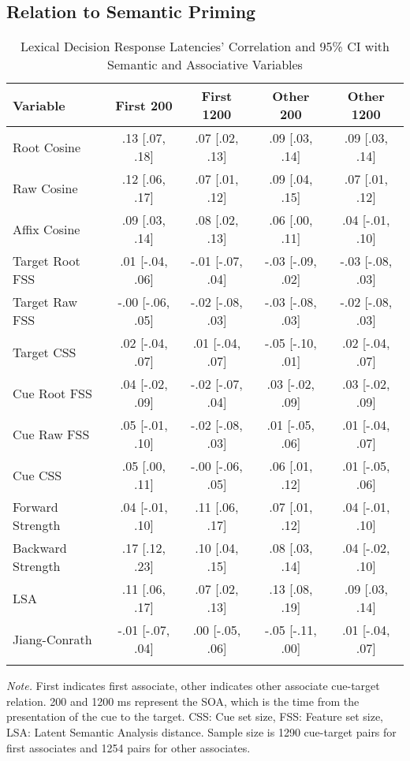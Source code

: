 \documentclass[english,,man]{apa6}
\theoremstyle{definition}
\theoremstyle{definition}
\theoremstyle{definition}
\theoremstyle{remark}
\begin{document}
\subsection{Relation to Semantic
Priming}\label{relation-to-semantic-priming}

\begin{table}[tbp]
\begin{center}
\begin{threeparttable}
\caption{\label{tab:ldt-table}Lexical Decision Response Latencies' Correlation and 95\% CI with Semantic and Associative Variables}
\small{
\begin{tabular}{lcccc}
\toprule
Variable & \multicolumn{1}{c}{First 200} & \multicolumn{1}{c}{First 1200} & \multicolumn{1}{c}{Other 200} & \multicolumn{1}{c}{Other 1200}\\
\midrule
Root Cosine & .13 [.07, .18] & .07 [.02, .13] & .09 [.03, .14] & .09 [.03, .14]\\
Raw Cosine & .12 [.06, .17] & .07 [.01, .12] & .09 [.04, .15] & .07 [.01, .12]\\
Affix Cosine & .09 [.03, .14] & .08 [.02, .13] & .06 [.00, .11] & .04 [-.01, .10]\\
Target Root FSS & .01 [-.04, .06] & -.01 [-.07, .04] & -.03 [-.09, .02] & -.03 [-.08, .03]\\
Target Raw FSS & -.00 [-.06, .05] & -.02 [-.08, .03] & -.03 [-.08, .03] & -.02 [-.08, .03]\\
Target CSS & .02 [-.04, .07] & .01 [-.04, .07] & -.05 [-.10, .01] & .02 [-.04, .07]\\
Cue Root FSS & .04 [-.02, .09] & -.02 [-.07, .04] & .03 [-.02, .09] & .03 [-.02, .09]\\
Cue Raw FSS & .05 [-.01, .10] & -.02 [-.08, .03] & .01 [-.05, .06] & .01 [-.04, .07]\\
Cue CSS & .05 [.00, .11] & -.00 [-.06, .05] & .06 [.01, .12] & .01 [-.05, .06]\\
Forward Strength & .04 [-.01, .10] & .11 [.06, .17] & .07 [.01, .12] & .04 [-.01, .10]\\
Backward Strength & .17 [.12, .23] & .10 [.04, .15] & .08 [.03, .14] & .04 [-.02, .10]\\
LSA & .11 [.06, .17] & .07 [.02, .13] & .13 [.08, .19] & .09 [.03, .14]\\
Jiang-Conrath & -.01 [-.07, .04] & .00 [-.05, .06] & -.05 [-.11, .00] & .01 [-.04, .07]\\
\bottomrule
\addlinespace
\end{tabular}
}
\begin{tablenotes}[para]
\normalsize{\textit{Note.} First indicates first associate, other indicates other associate cue-target relation. 200 and 1200 ms represent the SOA, which is the time from the presentation of the cue to the target. CSS: Cue set size, FSS: Feature set size, LSA: Latent Semantic Analysis distance. Sample size is 1290 cue-target pairs for first associates and 1254 pairs for other associates.}
\end{tablenotes}
\end{threeparttable}
\end{center}
\end{table}
\end{document}
